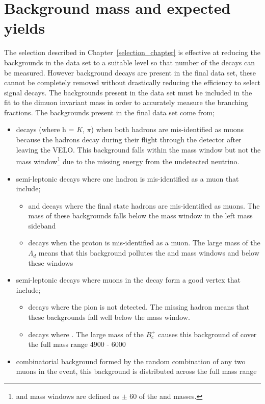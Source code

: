 {\section{Background mass \pdfs and expected yields}
\label{sec:backgrounds}
The selection described in Chapter~\ref{selection_chapter} is effective at reducing the backgrounds in the data set to a suitable level so that number of the \bmumu decays can be measured. However background decays are present in the final data set, these cannot be completely removed without drastically reducing the efficiency to select signal decays. The backgrounds present in the data set must be included in the fit to the dimuon invariant mass in order to accurately measure the \bmumu branching fractions. The backgrounds present in the final data set come from;
\begin{itemize}
\item \bhh decays (where h = $K$, $\pi$) when both hadrons are mis-identified as muons because the hadrons decay during their flight through the detector after leaving the VELO. This background falls within the \bd mass window but not the \bs mass window\footnote{\bd and \bs mass windows are defined as $\pm$ 60 \mevcc of the \bd and \bs masses.} due to the missing energy from the undetected neutrino. 
\item semi-leptonic decays where one hadron is mis-identified as a muon that include;
\begin{itemize}
\item \bdpimunu and \bsKmunu decays where the final state hadrons are mis-identified as muons. The mass of these backgrounds falls below the \bd mass window in the left mass sideband
\item \lambdab decays when the proton is mis-identified as a muon. The large mass of the $\Lambda_{d}$ means that this background pollutes the \bs and \bd mass windows and below these windows
\end{itemize}
\item semi-leptonic decays where muons in the decay form a good vertex that include;
\begin{itemize}
\item \bpimumu decays where the pion is not detected. The missing hadron means that these backgrounds fall well below the \bd mass window.
\item \bcjpsimunu decays where \jpsimumu. The large mass of the $B^{+}_{c}$ causes this background of cover the full mass range 4900 - 6000 \mevcc
\end{itemize}
\item combinatorial background formed by the random combination of any two muons in the event, this background is distributed across the full mass range
\end{itemize}

}
